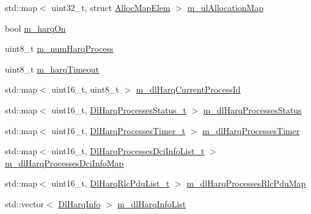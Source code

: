 \begin{DoxyCompactItemize}
std\+::map$<$ uint32\+\_\+t, struct \hyperlink{structns3_1_1MmWaveFlexTtiMaxRateMacScheduler_1_1AllocMapElem}{Alloc\+Map\+Elem} $>$ \hyperlink{classns3_1_1MmWaveFlexTtiMaxRateMacScheduler_af147a6545a940d5bd3394db2054582ab}{m\+\_\+ul\+Allocation\+Map}
\item 
bool \hyperlink{classns3_1_1MmWaveFlexTtiMaxRateMacScheduler_a43dee0cca8dce652c2a2dc750262708e}{m\+\_\+harq\+On}
\item 
uint8\+\_\+t \hyperlink{classns3_1_1MmWaveFlexTtiMaxRateMacScheduler_ad229b3714f9e9f608d37b712da546392}{m\+\_\+num\+Harq\+Process}
\item 
uint8\+\_\+t \hyperlink{classns3_1_1MmWaveFlexTtiMaxRateMacScheduler_ad3cec5d93ec933a49865b1d7178579ab}{m\+\_\+harq\+Timeout}
\item 
std\+::map$<$ uint16\+\_\+t, uint8\+\_\+t $>$ \hyperlink{classns3_1_1MmWaveFlexTtiMaxRateMacScheduler_a4613499b2e9a34f8bdaa610d400c6c88}{m\+\_\+dl\+Harq\+Current\+Process\+Id}
\item 
std\+::map$<$ uint16\+\_\+t, \hyperlink{classns3_1_1MmWaveFlexTtiMaxRateMacScheduler_a646125960a440f3d7a27348fd52600ef}{Dl\+Harq\+Processes\+Status\+\_\+t} $>$ \hyperlink{classns3_1_1MmWaveFlexTtiMaxRateMacScheduler_a3f74b4d493895851f7ee62f90584fe0c}{m\+\_\+dl\+Harq\+Processes\+Status}
\item 
std\+::map$<$ uint16\+\_\+t, \hyperlink{classns3_1_1MmWaveFlexTtiMaxRateMacScheduler_a8666ecbc7c57fc48e6b80498262dfee7}{Dl\+Harq\+Processes\+Timer\+\_\+t} $>$ \hyperlink{classns3_1_1MmWaveFlexTtiMaxRateMacScheduler_a8e10f292f6acda7b901589a74252dc95}{m\+\_\+dl\+Harq\+Processes\+Timer}
\item 
std\+::map$<$ uint16\+\_\+t, \hyperlink{classns3_1_1MmWaveFlexTtiMaxRateMacScheduler_a677cdc9a2f5c2bb82d941530fff1362e}{Dl\+Harq\+Processes\+Dci\+Info\+List\+\_\+t} $>$ \hyperlink{classns3_1_1MmWaveFlexTtiMaxRateMacScheduler_a1595e5398c1750599918db31324a3d68}{m\+\_\+dl\+Harq\+Processes\+Dci\+Info\+Map}
\item 
std\+::map$<$ uint16\+\_\+t, \hyperlink{classns3_1_1MmWaveFlexTtiMaxRateMacScheduler_a78f8972d64d788105f80e53e209fccba}{Dl\+Harq\+Rlc\+Pdu\+List\+\_\+t} $>$ \hyperlink{classns3_1_1MmWaveFlexTtiMaxRateMacScheduler_a5eeb7aeecc26d9849aadd3da24e00f68}{m\+\_\+dl\+Harq\+Processes\+Rlc\+Pdu\+Map}
\item 
std\+::vector$<$ \hyperlink{structns3_1_1DlHarqInfo}{Dl\+Harq\+Info} $>$ \hyperlink{classns3_1_1MmWaveFlexTtiMaxRateMacScheduler_a06e986195cd0656360fe3b94ac65d6ad}{m\+\_\+dl\+Harq\+Info\+List}
\item 

\end{DoxyCompactItemize}
